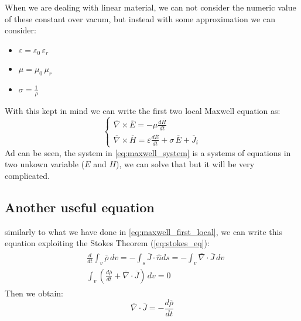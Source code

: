 When we are dealing with linear material, we can not consider the numeric value of these constant over vacum, but instead with some approximation we can consider:
\begin{itemize}
    \item $\varepsilon=\varepsilon_0\,\varepsilon_r$
    \item $\mu=\mu_0\,\mu_r$
    \item $\sigma=\frac{1}{\rho}$
\end{itemize}
With this kept in mind we can write the first two local Maxwell equation as:
\begin{equation}\label{eq:maxwell_system}
    \begin{cases}
    \overline{\nabla}\times\overline{E}=-\mu\frac{d\overline{H}}{dt}\\[5pt]
    \overline{\nabla}\times\overline{H}=\varepsilon\frac{d\overline{E}}{dt}+\sigma\,\overline{E}+\overline{J}_i
    \end{cases}
\end{equation}
Ad can be seen, the system in \cref{eq:maxwell_system} is a systems of equations in two unkown variable ($E$ and $H$), we can solve that but it will be very complicated.
\subsection*{Another useful equation}
similarly to what we have done in \cref{eq:maxwell_first_local}, we can write this equation exploiting the Stokes Theorem (\cref{eq:stokes_eq}):
    \begin{align}
    \begin{split}
    &\frac{d}{dt}\int_v\overline{\rho}\,dv=-\int_s \overline{J}\cdot \hat{n}ds=-\int_v\overline{\nabla}\cdot\overline{J}\,dv\\[5pt]
    &\int_v\left(\frac{d\overline{\rho}}{dt}+\overline{\nabla}\cdot\overline{J}\right)\,dv=0
    \end{split}
    \end{align}
Then we obtain:
\begin{equation}
    \overline{\nabla}\cdot\overline{J}=-\frac{d\overline{\rho}}{dt}
\end{equation}
